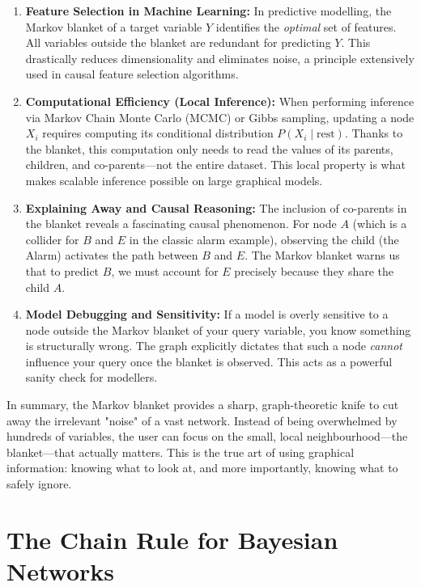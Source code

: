 \begin{enumerate}
    \item \textbf{Feature Selection in Machine Learning:} In predictive modelling, the Markov blanket of a target variable \(Y\) identifies the \emph{optimal} set of features. All variables outside the blanket are redundant for predicting \(Y\). This drastically reduces dimensionality and eliminates noise, a principle extensively used in causal feature selection algorithms.

    \item \textbf{Computational Efficiency (Local Inference):} When performing inference via Markov Chain Monte Carlo (MCMC) or Gibbs sampling, updating a node \(X_i\) requires computing its conditional distribution \(P(X_i \mid \text{rest})\). Thanks to the blanket, this computation only needs to read the values of its parents, children, and co-parents---not the entire dataset. This local property is what makes scalable inference possible on large graphical models.

    \item \textbf{Explaining Away and Causal Reasoning:} The inclusion of co-parents in the blanket reveals a fascinating causal phenomenon. For node \(A\) (which is a collider for \(B\) and \(E\) in the classic alarm example), observing the child (the Alarm) activates the path between \(B\) and \(E\). The Markov blanket warns us that to predict \(B\), we must account for \(E\) precisely because they share the child \(A\).

    \item \textbf{Model Debugging and Sensitivity:} If a model is overly sensitive to a node outside the Markov blanket of your query variable, you know something is structurally wrong. The graph explicitly dictates that such a node \emph{cannot} influence your query once the blanket is observed. This acts as a powerful sanity check for modellers.
\end{enumerate}

In summary, the Markov blanket provides a sharp, graph-theoretic knife to cut away the irrelevant "noise" of a vast network. Instead of being overwhelmed by hundreds of variables, the user can focus on the small, local neighbourhood—the blanket—that actually matters. This is the true art of using graphical information: knowing what to look at, and more importantly, knowing what to safely ignore.

\section{The Chain Rule for Bayesian Networks}\label{sec:chainrule}

